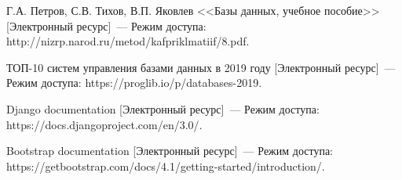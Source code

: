
\begin{thebibliography}{9} 
    
     Г.А. Петров, С.В. Тихов, В.П. Яковлев <<Базы данных, учебное пособие>> [Электронный ресурс]~--- Режим доступа: {http://nizrp.narod.ru/metod/kafpriklmatiif/8.pdf}.
    \addtocounter{bibqty}{1}
    
     ТОП-10 систем управления базами данных в 2019 году [Электронный ресурс]~--- Режим доступа: {https://proglib.io/p/databases-2019}.
    \addtocounter{bibqty}{1}
    
     Django documentation [Электронный ресурс]~--- Режим доступа: {https://docs.djangoproject.com/en/3.0/}.
    \addtocounter{bibqty}{1}
    
     Bootstrap documentation [Электронный ресурс]~--- Режим доступа: {https://getbootstrap.com/docs/4.1/getting-started/introduction/}.
    \addtocounter{bibqty}{1}
    
\end{thebibliography}
